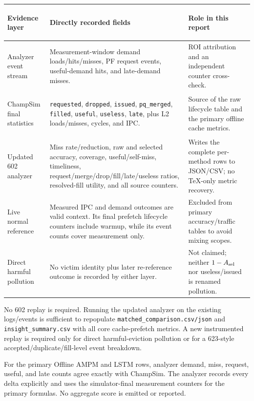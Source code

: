 \documentclass[10pt]{article}
\begin{document}
\begin{tabularx}{\textwidth}{@{}
  >{\bfseries\raggedright\arraybackslash}p{}
  >{\raggedright\arraybackslash}X
  >{\raggedright\arraybackslash}X@{}}
\toprule
Evidence layer & Directly recorded fields & Role in this report \\
\midrule
Analyzer event stream &
Measurement-window demand loads/hits/misses, PF request events,
useful-demand hits, and late-demand misses. &
ROI attribution and an independent counter cross-check.\\
ChampSim final statistics &
\texttt{requested}, \texttt{dropped}, \texttt{issued},
\texttt{pq\_merged}, \texttt{filled}, \texttt{useful},
\texttt{useless}, \texttt{late}, plus L2 loads/misses, cycles, and IPC. &
Source of the raw lifecycle table and the primary offline cache metrics.\\
Updated 602 analyzer &
Miss rate/reduction, raw and selected accuracy, coverage,
useful/self-miss, timeliness, request/merge/drop/fill/late/useless ratios,
resolved-fill utility, and all source counters. &
Writes the complete per-method rows to JSON/CSV; no TeX-only metric recovery.\\
Live normal reference &
Measured IPC and demand outcomes are valid context.  Its final prefetch
lifecycle counters include warmup, while its event counts cover measurement
only. &
Excluded from primary accuracy/traffic tables to avoid mixing scopes.\\
Direct harmful pollution &
No victim identity plus later re-reference outcome is recorded by either
layer. &
Not claimed; neither $1-A_{\rm sel}$ nor useless/issued is renamed pollution.\\
\bottomrule
\end{tabularx}

\begin{infobox}[title={\bfseries Analyze/replay decision}]
No 602 replay is required.  Running the updated analyzer on the existing
logs/events is sufficient to repopulate
\texttt{matched\_comparison.csv/json} and
\texttt{insight\_summary.csv} with all core cache-prefetch metrics.
A new instrumented replay is required only for direct harmful-eviction
pollution or for a 623-style accepted/duplicate/fill-level event breakdown.
\end{infobox}

{\footnotesize For the primary Offline AMPM and LSTM rows, analyzer demand,
miss, request, useful, and late counts agree exactly with ChampSim.  The
analyzer records every delta explicitly and uses the simulator-final
measurement counters for the primary formulas.  No aggregate score is emitted
or reported.}
\end{document}
